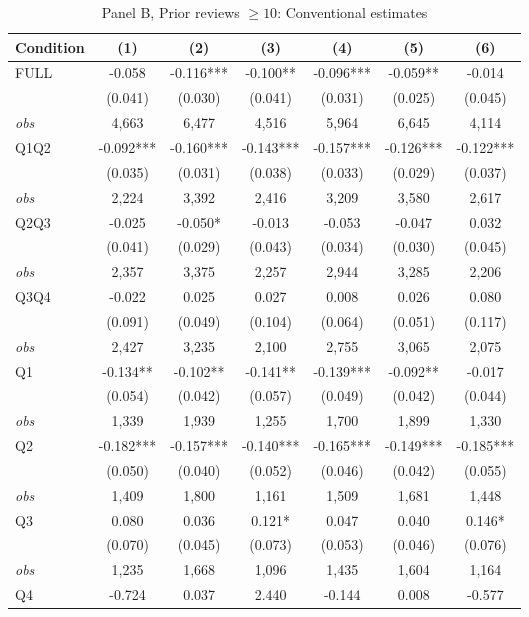 \documentclass[11pt]{article}
\begin{document}
\begin{table}[!htbp]
\centering
\caption{Panel B, Prior reviews $\geq 10$: Conventional estimates}
\label{tab:trim00:b:prior_reviews_ge10}
\small
\begin{tabular}{lcccccc}
\toprule
Condition & (1) & (2) & (3) & (4) & (5) & (6) \\
\midrule
FULL & -0.058 & -0.116*** & -0.100** & -0.096*** & -0.059** & -0.014 \\
 & (0.041) & (0.030) & (0.041) & (0.031) & (0.025) & (0.045) \\
\textit{obs} & 4,663 & 6,477 & 4,516 & 5,964 & 6,645 & 4,114 \\
Q1Q2 & -0.092*** & -0.160*** & -0.143*** & -0.157*** & -0.126*** & -0.122*** \\
 & (0.035) & (0.031) & (0.038) & (0.033) & (0.029) & (0.037) \\
\textit{obs} & 2,224 & 3,392 & 2,416 & 3,209 & 3,580 & 2,617 \\
Q2Q3 & -0.025 & -0.050* & -0.013 & -0.053 & -0.047 & 0.032 \\
 & (0.041) & (0.029) & (0.043) & (0.034) & (0.030) & (0.045) \\
\textit{obs} & 2,357 & 3,375 & 2,257 & 2,944 & 3,285 & 2,206 \\
Q3Q4 & -0.022 & 0.025 & 0.027 & 0.008 & 0.026 & 0.080 \\
 & (0.091) & (0.049) & (0.104) & (0.064) & (0.051) & (0.117) \\
\textit{obs} & 2,427 & 3,235 & 2,100 & 2,755 & 3,065 & 2,075 \\
Q1 & -0.134** & -0.102** & -0.141** & -0.139*** & -0.092** & -0.017 \\
 & (0.054) & (0.042) & (0.057) & (0.049) & (0.042) & (0.044) \\
\textit{obs} & 1,339 & 1,939 & 1,255 & 1,700 & 1,899 & 1,330 \\
Q2 & -0.182*** & -0.157*** & -0.140*** & -0.165*** & -0.149*** & -0.185*** \\
 & (0.050) & (0.040) & (0.052) & (0.046) & (0.042) & (0.055) \\
\textit{obs} & 1,409 & 1,800 & 1,161 & 1,509 & 1,681 & 1,448 \\
Q3 & 0.080 & 0.036 & 0.121* & 0.047 & 0.040 & 0.146* \\
 & (0.070) & (0.045) & (0.073) & (0.053) & (0.046) & (0.076) \\
\textit{obs} & 1,235 & 1,668 & 1,096 & 1,435 & 1,604 & 1,164 \\
Q4 & -0.724 & 0.037 & 2.440 & -0.144 & 0.008 & -0.577 \\

\end{tabular}
\end{table}
\end{document}
